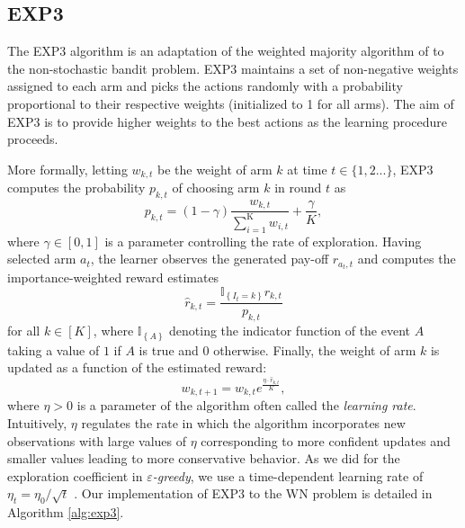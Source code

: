\documentclass[preprint,12pt]{elsarticle}
\begin{document}
\subsection{EXP3}
\label{section:bandits_exp3}	
The EXP3 algorithm \cite{auer1995gambling,auer2002nonstochastic} is an adaptation of the weighted majority algorithm of \cite{LW94,FS97} to the non-stochastic bandit problem. EXP3 maintains a set of non-negative weights assigned to each arm and picks the actions randomly with a probability proportional to their respective weights (initialized to 1 for all arms). The aim of EXP3 is to provide higher weights to the best actions as the learning procedure proceeds. 

More formally, letting $w_{k,t}$ be the weight of arm $k$ at time $t \in \{1,2 ...\}$, EXP3 computes the probability $p_{k,t}$ of choosing arm $k$ in round $t$ as
\begin{equation}
\label{eq:exp3_prob}
p_{k,t} = (1-\gamma) \frac{w_{k,t}}{\sum_{i=1}^{\text{K}}w_{i,t}} + \frac{\gamma}{K},
\nonumber
\end{equation}
where $\gamma\in[0,1]$ is a parameter controlling the rate of exploration.
Having selected arm $a_t$, the learner observes the generated pay-off $r_{a_t,t}$ and computes the importance-weighted reward estimates
\begin{equation}
\label{eq:exp3_estimated_reward}
\widehat{r}_{k,t} = \frac{\mathbb{I}_{\left\{I_t = k\right\}}r_{k,t}}{p_{k,t}}
\nonumber
\end{equation}
for all $k\in[K]$, where $\mathbb{I}_{\left\{A \right\}}$ denoting the indicator function of the event $A$ taking a value of $1$ if $A$ is true and $0$ otherwise.
Finally, the weight of arm $k$ is updated as a function of the estimated reward:
\begin{equation}
\label{eq:exp3_weights}
w_{k,t+1}=w_{k,t} e^{\frac{\eta \cdot \widehat{r}_{k,t}}{K}},
\nonumber
\end{equation}	
where $\eta>0$ is a parameter of the algorithm often called the \emph{learning rate}. Intuitively, $\eta$ regulates the rate in which the algorithm incorporates new observations with large values of $\eta$ corresponding to more confident updates and smaller values leading to more conservative behavior. As we did for the exploration coefficient in \emph{$\varepsilon$-greedy}, we use a time-dependent learning rate of $\eta_t = \eta_0 / \sqrt{t}$ \cite{auer2002finite}. Our implementation of EXP3 to the WN problem is detailed in Algorithm \ref{alg:exp3}.
\end{document}

